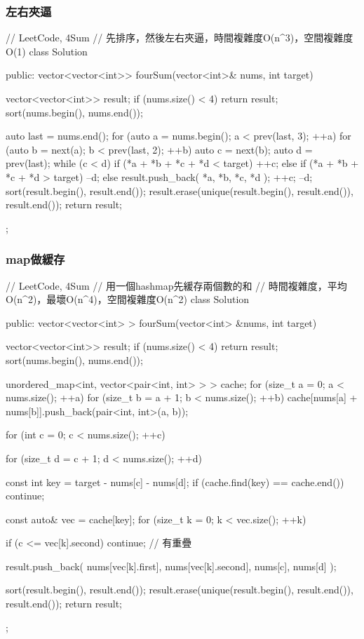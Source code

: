 \subsubsection{左右夾逼}
\begin{Code}
// LeetCode, 4Sum
// 先排序，然後左右夾逼，時間複雜度O(n^3)，空間複雜度O(1)
class Solution {
public:
    vector<vector<int>> fourSum(vector<int>& nums, int target) {
        vector<vector<int>> result;
        if (nums.size() < 4) return result;
        sort(nums.begin(), nums.end());

        auto last = nums.end();
        for (auto a = nums.begin(); a < prev(last, 3); ++a) {
            for (auto b = next(a); b < prev(last, 2); ++b) {
                auto c = next(b);
                auto d = prev(last);
                while (c < d) {
                    if (*a + *b + *c + *d < target) {
                        ++c;
                    } else if (*a + *b + *c + *d > target) {
                        --d;
                    } else {
                        result.push_back({ *a, *b, *c, *d });
                        ++c;
                        --d;
                    }
                }
            }
        }
        sort(result.begin(), result.end());
        result.erase(unique(result.begin(), result.end()), result.end());
        return result;
    }
};
\end{Code}


\subsubsection{map做緩存}
\begin{Code}
// LeetCode, 4Sum
// 用一個hashmap先緩存兩個數的和
// 時間複雜度，平均O(n^2)，最壞O(n^4)，空間複雜度O(n^2)
class Solution {
public:
    vector<vector<int> > fourSum(vector<int> &nums, int target) {
        vector<vector<int>> result;
        if (nums.size() < 4) return result;
        sort(nums.begin(), nums.end());

        unordered_map<int, vector<pair<int, int> > > cache;
        for (size_t a = 0; a < nums.size(); ++a) {
            for (size_t b = a + 1; b < nums.size(); ++b) {
                cache[nums[a] + nums[b]].push_back(pair<int, int>(a, b));
            }
        }

        for (int c = 0; c < nums.size(); ++c) {
            for (size_t d = c + 1; d < nums.size(); ++d) {
                const int key = target - nums[c] - nums[d];
                if (cache.find(key) == cache.end()) continue;

                const auto& vec = cache[key];
                for (size_t k = 0; k < vec.size(); ++k) {
                    if (c <= vec[k].second)
                        continue; // 有重疊

                    result.push_back( { nums[vec[k].first],
                            nums[vec[k].second], nums[c], nums[d] });
                }
            }
        }
        sort(result.begin(), result.end());
        result.erase(unique(result.begin(), result.end()), result.end());
        return result;
    }
};
\end{Code}


